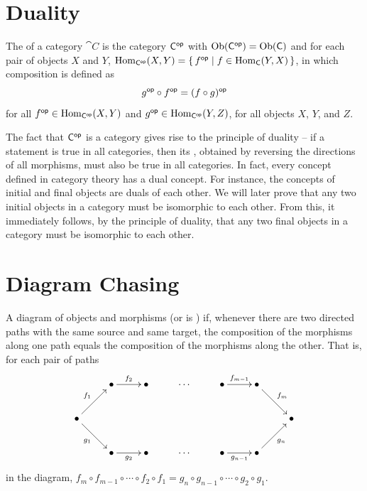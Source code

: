 \section{Duality}\label{sec:Duality}
The  of a category $\cat C$ is the category $\mathsf{C}^\mathsf{op}$ with $\operatorname{Ob}(\mathsf{C}^\mathsf{op}) = \operatorname{Ob}(\mathsf{C})$ and for each pair of objects $X$ and $Y$, \spliteq$\operatorname{Hom}_{\mathsf{C}^\mathsf{op}}(X, Y) = \qty{\, f^\mathsf{op}\mid f \in \operatorname{Hom}_{\mathsf{C}}(Y, X) \,}$, in which composition is defined as
\begin{equation*}
g^\mathsf{op} \circ f^\mathsf{op} = (f \circ g)^\mathsf{op}
\end{equation*}
for all $f^\mathsf{op} \in \operatorname{Hom}_{\mathsf{C}^\mathsf{op}}(X, Y)$ and $g^\mathsf{op} \in \operatorname{Hom}_{\mathsf{C}^\mathsf{op}}(Y, Z)$, for all objects $X$, $Y$, and $Z$.

The fact that $\mathsf{C}^\mathsf{op}$ is a category gives rise to the principle of duality -- if a statement is true in all categories, then its , obtained by reversing the directions of all morphisms, must also be true in all categories. In fact, every concept defined in category theory has a dual concept. For instance, the concepts of initial and final objects are duals of each other. We will later prove that any two initial objects in a category must be isomorphic to each other. From this, it immediately follows, by the principle of duality, that any two final objects in a category must be isomorphic to each other.


\section{Diagram Chasing}\label{sec:DiagramChasing}

A diagram of objects and morphisms  (or is ) if, whenever there are two directed paths with the same source and same target, the composition of the morphisms along one path equals the composition of the morphisms along the other. That is, for each pair of paths
\begin{equation*}
\xymatrix{
& \bullet \ar[r]^{f_2} &  \bullet & \cdots & \bullet \ar[r]^{f_{m-1}} & \bullet \ar[rd]^{f_m} & \\
\bullet \ar[ru]^{f_1} \ar[rd]_{g_1} &&&&&& \bullet \\
& \bullet \ar[r]_{g_2} & \bullet & \cdots & \bullet \ar[r]_{g_{n-1}} & \bullet \ar[ru]_{g_n} &
}
\end{equation*}
in the diagram, $f_m \circ f_{m-1} \circ \cdots \circ f_2 \circ f_1 = g_n \circ g_{n-1} \circ \cdots \circ g_2 \circ g_1$.

